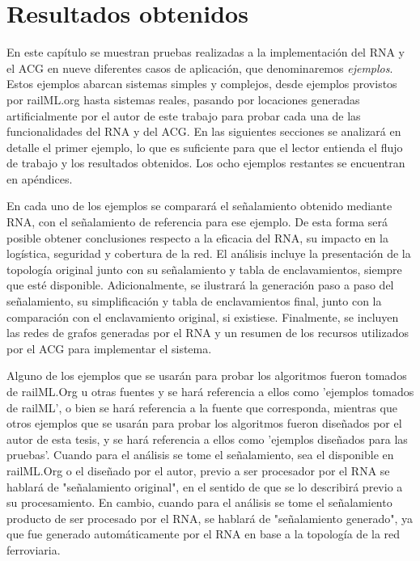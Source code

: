 \chapter{Resultados obtenidos}
	\label{sec:resultados}

	En este capítulo se muestran pruebas realizadas a la implementación del RNA y el ACG en nueve diferentes casos de aplicación, que denominaremos \textit{ejemplos}. Estos ejemplos abarcan sistemas simples y complejos, desde ejemplos provistos por railML.org hasta sistemas reales, pasando por locaciones generadas artificialmente por el autor de este trabajo para probar cada una de las funcionalidades del RNA y del ACG. En las siguientes secciones se analizará en detalle el primer ejemplo, lo que es suficiente para que el lector entienda el flujo de trabajo y los resultados obtenidos. Los ocho ejemplos restantes se encuentran en apéndices.
	
	En cada uno de los ejemplos se comparará el señalamiento obtenido mediante RNA, con el señalamiento de referencia para ese ejemplo. De esta forma será posible obtener conclusiones respecto a la eficacia del RNA, su impacto en la logística, seguridad y cobertura de la red. El análisis incluye la presentación de la topología original junto con su señalamiento y tabla de enclavamientos, siempre que esté disponible. Adicionalmente, se ilustrará la generación paso a paso del señalamiento, su simplificación y tabla de enclavamientos final, junto con la comparación con el enclavamiento original, si existiese. Finalmente, se incluyen las redes de grafos generadas por el RNA y un resumen de los recursos utilizados por el ACG para implementar el sistema.
	
	Alguno de los ejemplos que se usarán para probar los algoritmos fueron tomados de railML.Org u otras fuentes y se hará referencia a ellos como 'ejemplos tomados de railML', o bien se hará referencia a la fuente que corresponda, mientras que otros ejemplos que se usarán para probar los algoritmos fueron diseñados por el autor de esta tesis, y se hará referencia a ellos como 'ejemplos diseñados para las pruebas'. Cuando para el análisis se tome el señalamiento, sea el disponible en railML.Org o el diseñado por el autor, previo a ser procesador por el RNA se hablará de "señalamiento original", en el sentido de que se lo describirá previo a su procesamiento. En cambio, cuando para el análisis se tome el señalamiento producto de ser procesado por el RNA, se hablará de "señalamiento generado", ya que fue generado automáticamente por el RNA en base a la topología de la red ferroviaria.	
	
	
	
	
